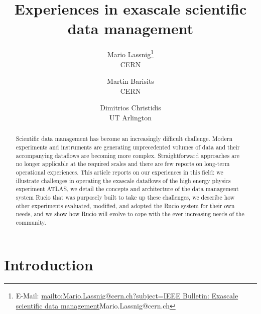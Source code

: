 \documentclass[11pt]{article}
\begin{document}
\title{Experiences in exascale scientific data management}

\author{
Mario Lassnig\thanks{E-Mail: \protect\url{mailto:Mario.Lassnig@cern.ch?subject=IEEE Bulletin: Exascale scientific data management}{Mario.Lassnig@cern.ch}}\\CERN \and
Martin Barisits\\CERN \and
Dimitrios Christidis\\UT Arlington
}

\maketitle

\begin{abstract}
Scientific data management has become an increasingly difficult challenge. Modern experiments and instruments are generating unprecedented volumes of data and their accompanying dataflows are becoming more complex. Straightforward approaches are no longer applicable at the required scales and there are few reports on long-term operational experiences. This article reports on our experiences in this field: we illustrate challenges in operating the exascale dataflows of the high energy physics experiment ATLAS, we detail the concepts and architecture of the data management system Rucio that was purposely built to take up these challenges, we describe how other experiments evaluated, modified, and adopted the Rucio system for their own needs, and we show how Rucio will evolve to cope with the ever increasing needs of the community.
\end{abstract}

\section{Introduction}
\end{document}
